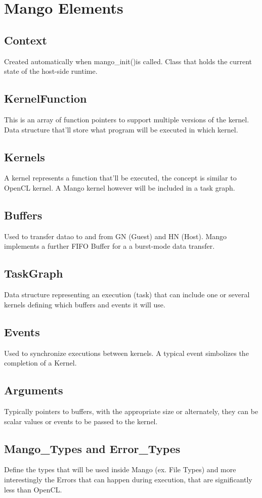 \documentclass[a4paper]{article}
\begin{document}
\section{Mango Elements}
\subsection{Context}
Created automatically when \ttfamily mango\_init()\rmfamily is called. Class that holds the current state of the host-side runtime.
\subsection{KernelFunction}
This is an array of function pointers to support multiple versions of the kernel. Data structure that'll store what program will be executed in which kernel.
\subsection{Kernels}
A kernel represents a function that'll be executed, the concept is similar to OpenCL kernel. A Mango kernel however will be included in a task graph.
\subsection{Buffers}
Used to transfer datao to and from GN (Guest) and HN (Host). Mango implements a further FIFO Buffer for a a burst-mode data transfer.
\subsection{TaskGraph}
Data structure representing an execution (task) that can include one or several kernels defining which buffers and events it will use.
\subsection{Events}
Used to synchronize executions between kernels. A typical event simbolizes the completion of a Kernel.
\subsection{Arguments}
Typically pointers to buffers, with the appropriate size or alternately, they can be scalar values or events to be passed to the kernel.
\subsection{Mango\_Types and Error\_Types}
Define the types that will be used inside Mango (ex. File Types) and more interestingly the Errors that can happen during execution, that are significantly less than OpenCL. 
\end{document}
